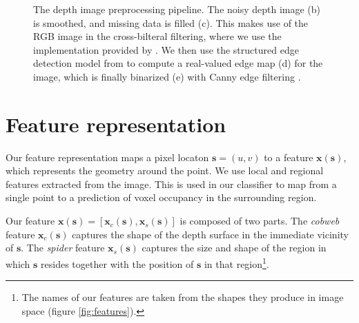 \documentclass[10pt,twocolumn,letterpaper]{article}
\newcommand{\pixelidx}{\mathbf{s}}
\begin{document}
\begin{figure}[tb]
    \caption{
    The depth image preprocessing pipeline.
    The noisy depth image (b) is smoothed, and missing data is filled (c). 
    This makes use of the RGB image in the cross-bilteral filtering, where we use the implementation provided by \cite{silberman-eccv-2012}.
    We then use the structured edge detection model from \cite{dollar-iccv-2013} to compute a real-valued edge map (d) for the image, which is finally binarized (e) with Canny edge filtering \cite{canny-pami-1986}.
    }%
    \label{fig:preprocessing}
\end{figure}


\section{Feature representation}
\label{sec:features}
\newcommand{\feat}{\mathbf{x}}

Our feature representation maps a pixel locaton $\pixelidx = (u, v)$ to a feature $\feat(\pixelidx)$, which represents the geometry around the point.
We use local and regional features extracted from the image.
This is used in our classifier to map from a single point to a prediction of voxel occupancy in the surrounding region.

Our feature $\feat(\pixelidx) = [\feat_c(\pixelidx), \feat_s(\pixelidx)]$ is composed of two parts.
The \emph{cobweb} feature $\feat_c(\pixelidx)$ captures the shape of the depth surface in the immediate vicinity of $\pixelidx$. 
The \emph{spider} feature $\feat_s(\pixelidx)$ captures the size and shape of the region in which $\pixelidx$ resides together with the position of $\pixelidx$ in that region\footnote{The names of our features are taken from the shapes they produce in image space (figure \ref{fig:features}).}.


\end{document}
